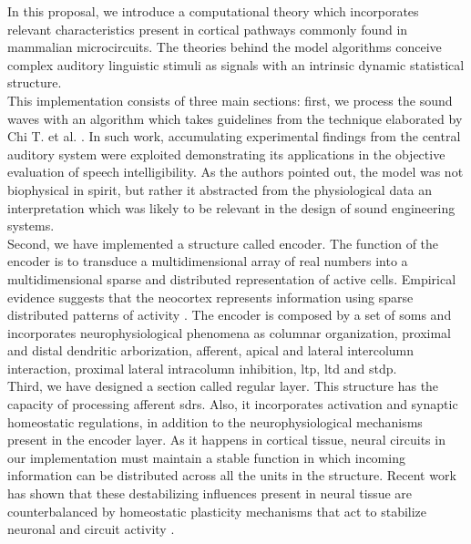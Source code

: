 \documentclass[11pt,a4paper]{article}
\begin{document}
In this proposal, we introduce a computational
theory which incorporates relevant
characteristics present in cortical pathways commonly found in mammalian
microcircuits. The theories behind the model algorithms conceive complex
auditory linguistic stimuli as signals with an intrinsic dynamic statistical
structure. \\

This implementation consists of three main sections:
first, we process the sound waves with an algorithm
which takes guidelines from
the technique elaborated by Chi T. et al. \cite{chi_2005}.
In such work, accumulating experimental findings
from the central auditory system
were exploited demonstrating its applications in the objective
evaluation of speech intelligibility.
As the authors pointed out, the model was not biophysical in spirit,
but rather it abstracted from the physiological data an interpretation
which was likely to be relevant in the design of sound engineering systems. \\

Second, we have implemented a structure called encoder.
The function of the encoder is to transduce a multidimensional
array of real numbers into a multidimensional sparse and distributed representation of
active cells. Empirical evidence suggests that the neocortex represents 
information using sparse distributed patterns of activity \cite{barth_2012}.
The encoder is composed by a set of \glspl{som} \cite{kohonen_2082, Kohonen:1989:SAM:69371}
and incorporates neurophysiological phenomena as columnar organization, proximal and distal
dendritic arborization, afferent, apical and lateral intercolumn interaction, proximal
lateral intracolumn inhibition, \gls{ltp}, \gls{ltd} and \gls{stdp}. \\

Third, we have designed a section called regular layer. This structure has the capacity of
processing afferent \glspl{sdr}. Also,
it incorporates activation and synaptic homeostatic regulations,
in addition to the neurophysiological
mechanisms present in the encoder layer.
As it happens in cortical tissue, neural circuits in our implementation
must maintain a stable function in which incoming information can be distributed
across all the units in the structure.
Recent work has shown that these destabilizing influences present in neural tissue
are counterbalanced
by homeostatic plasticity mechanisms that act to stabilize neuronal
and circuit activity \cite{turrigiano_2012}. \\
\end{document}
